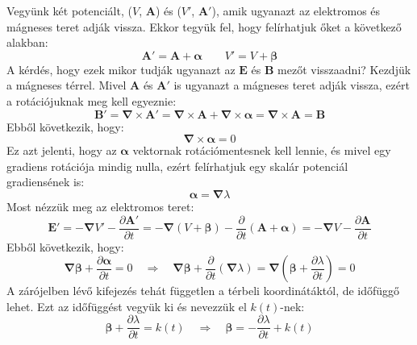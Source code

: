 \documentclass[../main.tex]{subfiles}
\begin{document}
Vegyünk két potenciált, ($V$, $\mathbf{A}$) és ($V'$, $\mathbf{A}'$), amik ugyanazt az elektromos és mágneses teret adják vissza. Ekkor tegyük fel, hogy felírhatjuk őket a következő alakban:
\begin{equation}
    \mathbf{A}' = \mathbf{A} + \boldsymbol{\alpha} \qquad V' = V + \boldsymbol{\beta}
\end{equation}
A kérdés, hogy ezek mikor tudják ugyanazt az $\mathbf{E}$ és $\mathbf{B}$ mezőt visszaadni? Kezdjük a mágneses térrel. Mivel $\mathbf{A}$ és $\mathbf{A}'$ is ugyanazt a mágneses teret adják vissza, ezért a rotációjuknak meg kell egyeznie:
\begin{equation}
    \mathbf{B}' = \boldsymbol{\nabla} \times \mathbf{A}' = \boldsymbol{\nabla} \times \mathbf{A} + \boldsymbol{\nabla} \times \boldsymbol{\alpha} = \boldsymbol{\nabla} \times \mathbf{A} = \mathbf{B}
\end{equation}
Ebből következik, hogy:
\begin{equation}
    \boldsymbol{\nabla} \times \boldsymbol{\alpha} = 0
\end{equation}
Ez azt jelenti, hogy az $\boldsymbol{\alpha}$ vektornak rotációmentesnek kell lennie, és mivel egy gradiens rotációja mindig nulla, ezért felírhatjuk egy skalár potenciál gradiensének is:
\begin{equation}
    \boldsymbol{\alpha} = \boldsymbol{\nabla} \lambda
\end{equation}
Most nézzük meg az elektromos teret:
\begin{equation}
    \mathbf{E}' = - \boldsymbol{\nabla} V' - \frac{\partial \mathbf{A}'}{\partial t} = - \boldsymbol{\nabla} (V + \boldsymbol{\beta}) - \frac{\partial }{\partial t} (\mathbf{A} + \boldsymbol{\alpha}) = - \boldsymbol{\nabla} V - \frac{\partial \mathbf{A}}{\partial t}
\end{equation}
Ebből következik, hogy:
\begin{equation}
    \boldsymbol{\nabla} \boldsymbol{\beta} + \frac{\partial \boldsymbol{\alpha}}{\partial t} = 0 \quad \Rightarrow \quad \boldsymbol{\nabla} \boldsymbol{\beta} + \frac{\partial }{\partial t} (\boldsymbol{\nabla} \lambda) = \boldsymbol{\nabla} (\boldsymbol{\beta} + \frac{\partial \lambda}{\partial t}) = 0
\end{equation}
A zárójelben lévő kifejezés tehát független a térbeli koordinátáktól, de időfüggő lehet. Ezt az időfüggést vegyük ki és nevezzük el $k(t)$-nek:
\begin{equation}
    \boldsymbol{\beta} + \frac{\partial \lambda}{\partial t} = k(t) \quad \Rightarrow \quad \boldsymbol{\beta} = - \frac{\partial \lambda}{\partial t} + k(t)
\end{equation}
\end{document}
